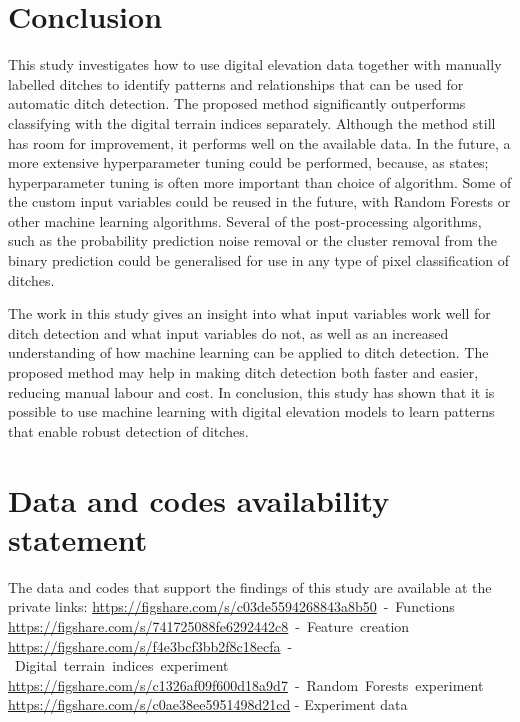 \documentclass[]{interact}
\theoremstyle{plain}%
\theoremstyle{definition}
\theoremstyle{remark}
\begin{document}
\section{Conclusion}

This study investigates how to use digital elevation data together with manually labelled ditches to identify patterns and relationships that can be used for automatic ditch detection. The proposed method significantly outperforms classifying with the digital terrain indices separately. Although the method still has room for improvement, it performs well on the available data. In the future, a more extensive hyperparameter tuning could be performed, because, as \citet{lavesson} states; hyperparameter tuning is often more important than choice of algorithm. Some of the custom input variables could be reused in the future, with Random Forests or other machine learning algorithms. Several of the post-processing algorithms, such as the probability prediction noise removal or the cluster removal from the binary prediction could be generalised for use in any type of pixel classification of ditches.

The work in this study gives an insight into what input variables work well for ditch detection and what input variables do not, as well as an increased understanding of how machine learning can be applied to ditch detection. The proposed method may help in making ditch detection both faster and easier, reducing manual labour and cost. In conclusion, this study has shown that it is possible to use machine learning with digital elevation models to learn patterns that enable robust detection of ditches.

\section*{Data and codes availability statement}
The data and codes that support the findings of this study are available at the private links:\newline
\mbox{\href{https://figshare.com/s/c03de5594268843a8b50}{https://figshare.com/s/c03de5594268843a8b50} - Functions\itshape\ignorespaces}
\mbox{\href{https://figshare.com/s/741725088fe6292442c8}{https://figshare.com/s/741725088fe6292442c8} - Feature creation\itshape\ignorespaces}
\mbox{\href{https://figshare.com/s/f4e3bcf3bb2f8c18ecfa}{https://figshare.com/s/f4e3bcf3bb2f8c18ecfa} - Digital terrain indices experiment\itshape\ignorespaces}
\mbox{\href{https://figshare.com/s/c1326af09f600d18a9d7}{https://figshare.com/s/c1326af09f600d18a9d7} - Random Forests experiment\itshape\ignorespaces}
\mbox{\href{https://figshare.com/s/c0ae38ee5951498d21cd}{https://figshare.com/s/c0ae38ee5951498d21cd}} - Experiment data
\end{document}
